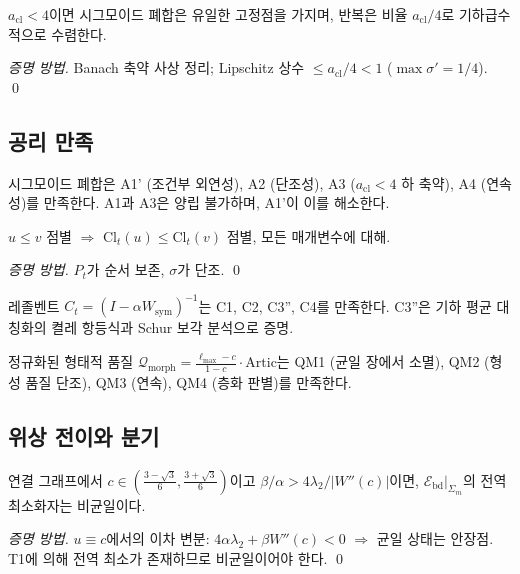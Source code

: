 \begin{theorem}
\label{thm:T6b}
$a_{\mathrm{cl}} < 4$이면 시그모이드 폐합은 유일한 고정점을 가지며, 반복은 비율 $a_{\mathrm{cl}}/4$로 기하급수적으로 수렴한다.
\end{theorem}
\begin{proof}[증명 방법]
Banach 축약 사상 정리; Lipschitz 상수 $\leq a_{\mathrm{cl}}/4 < 1$ ($\max \sigma' = 1/4$). \qed
\end{proof}

\subsection{공리 만족}

\begin{theorem}
\label{thm:T20}
시그모이드 폐합은 A1' (조건부 외연성), A2 (단조성), A3 ($a_{\mathrm{cl}} < 4$ 하 축약), A4 (연속성)를 만족한다. A1과 A3은 양립 불가하며, A1'이 이를 해소한다.
\end{theorem}

\begin{theorem}
\label{thm:TA2}
$u \leq v$ 점별 $\Rightarrow$ $\mathrm{Cl}_t(u) \leq \mathrm{Cl}_t(v)$ 점별, 모든 매개변수에 대해.
\end{theorem}
\begin{proof}[증명 방법]
$P_t$가 순서 보존, $\sigma$가 단조. \qed
\end{proof}

\begin{theorem}[C-Axioms. 공-소속 공리 만족]
\label{thm:C-Axioms}
레졸벤트 $C_t = (I - \alpha W_{\mathrm{sym}})^{-1}$는 C1, C2, C3'', C4를 만족한다. C3''은 기하 평균 대칭화의 켤레 항등식과 Schur 보각 분석으로 증명.
\end{theorem}

\begin{theorem}
\label{thm:QM}
정규화된 형태적 품질 $\mathcal{Q}_{\mathrm{morph}} = \frac{\ell_{\max} - c}{1 - c} \cdot \mathrm{Artic}$는 QM1 (균일 장에서 소멸), QM2 (형성 품질 단조), QM3 (연속), QM4 (층화 판별)를 만족한다.
\end{theorem}

\subsection{위상 전이와 분기}

\begin{theorem}
\label{thm:T8-Core}
연결 그래프에서 $c \in (\frac{3-\sqrt{3}}{6}, \frac{3+\sqrt{3}}{6})$이고 $\beta/\alpha > 4\lambda_2/|W''(c)|$이면, $\mathcal{E}_{\mathrm{bd}}|_{\Sigma_m}$의 전역 최소화자는 비균일이다.
\end{theorem}
\begin{proof}[증명 방법]
$u \equiv c$에서의 이차 변분: $4\alpha\lambda_2 + \beta W''(c) < 0$ $\Rightarrow$ 균일 상태는 안장점. T1에 의해 전역 최소가 존재하므로 비균일이어야 한다. \qed
\end{proof}

